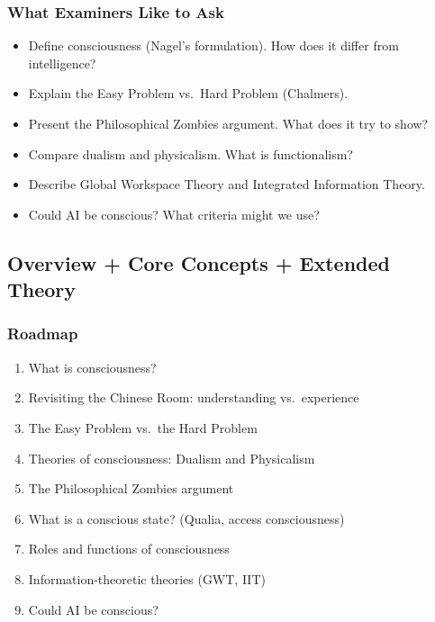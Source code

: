\separator

\subsubsection*{What Examiners Like to Ask}

\begin{itemize}
  \item Define consciousness (Nagel's formulation). How does it differ from intelligence?
  \item Explain the Easy Problem vs.\ Hard Problem (Chalmers).
  \item Present the Philosophical Zombies argument. What does it try to show?
  \item Compare dualism and physicalism. What is functionalism?
  \item Describe Global Workspace Theory and Integrated Information Theory.
  \item Could AI be conscious? What criteria might we use?
\end{itemize}

\bigseparator

\subsection{Overview + Core Concepts + Extended Theory}

\subsubsection*{Roadmap}
\begin{enumerate}
  \item What is consciousness?
  \item Revisiting the Chinese Room: understanding vs.\ experience
  \item The Easy Problem vs.\ the Hard Problem
  \item Theories of consciousness: Dualism and Physicalism
  \item The Philosophical Zombies argument
  \item What is a conscious state? (Qualia, access consciousness)
  \item Roles and functions of consciousness
  \item Information-theoretic theories (GWT, IIT)
  \item Could AI be conscious?
\end{enumerate}

